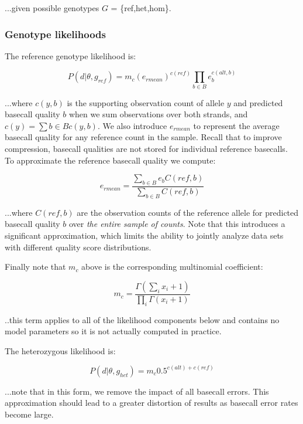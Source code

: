 \documentclass{article}
\begin{document}
...given possible genotypes $G$ = \{ref,het,hom\}.

\subsubsection{Genotype likelihoods}

The reference genotype likelihood is:

\begin{equation*}
P ( d \vert \theta, g_{ref}) = m_c (e_{rmean})^{c(ref)} \prod_{b \in B} e_b^{c(alt,b)}
\end{equation*}

...where $c(y,b)$ is the supporting observation count of allele $y$ and predicted basecall quality $b$ when we sum observations over both strands, and $c(y) = \sum{b \in B} c(y,b)$. We also introduce $e_{rmean}$ to represent the average basecall quality for any reference count in the sample. Recall that to improve compression, basecall qualities are not stored for individual reference basecalls. To approximate the reference basecall quality we compute:

\begin{equation*}
e_{rmean} = \frac{\sum_{b \in B} e_b C(ref,b)}{\sum_{b \in B} C(ref,b)}
\end{equation*}

...where $C(ref,b)$ are the observation counts of the reference allele for predicted basecall quality $b$ over \emph{the entire sample of counts}. Note that this introduces a significant approximation, which limits the ability to jointly analyze data sets with different quality score distributions.

Finally note that $m_c$ above is the corresponding multinomial coefficient:

\begin{equation*}
m_c = \frac{\Gamma(\sum_{i}{x_i + 1})}{\prod_{i}{\Gamma(x_i+1)}}
\end{equation*}

..this term applies to all of the likelihood components below and contains no model parameters so it is not actually computed in practice.

The heterozygous likelihood is:

\begin{equation*}
P (d \vert \theta, g_{het}) = m_c 0.5^{c(alt) + c(ref)}
\end{equation*}

...note that in this form, we remove the impact of all basecall errors. This approximation should lead to a greater distortion of results as basecall error rates become large.
\end{document}
